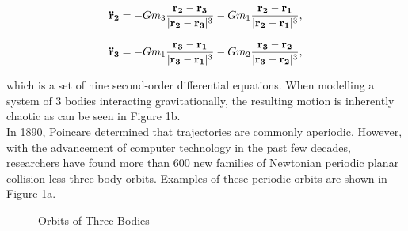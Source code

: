 \documentclass{article}
\begin{document}
\begin{equation}
    \mathbf{\Ddot{r}_2} = -Gm_3\frac{\mathbf{r_2}-\mathbf{r_3}}{\lvert\mathbf{r_2}-\mathbf{r_3}\rvert^3} - Gm_1\frac{\mathbf{r_2}-\mathbf{r_1}}{\lvert\mathbf{r_2}-\mathbf{r_1}\rvert^3},
\end{equation}

\begin{equation}
    \mathbf{\Ddot{r}_3} = -Gm_1\frac{\mathbf{r_3}-\mathbf{r_1}}{\lvert\mathbf{r_3}-\mathbf{r_1}\rvert^3} - Gm_2\frac{\mathbf{r_3}-\mathbf{r_2}}{\lvert\mathbf{r_3}-\mathbf{r_2}\rvert^3},
\end{equation}

\noindent which is a set of nine second-order differential equations. When modelling a system of 3 bodies interacting gravitationally, the resulting motion is inherently chaotic as can be seen in Figure 1b. \\

\noindent In 1890, Poincare determined that trajectories are commonly aperiodic. However, with the advancement of computer technology in the past few decades, researchers have found more than 600 new families of Newtonian periodic planar collision-less three-body orbits. Examples of these periodic orbits are shown in Figure 1a. \\


\begin{figure}%
    \centering
    \qquad
    \caption{Orbits of Three Bodies}%
    \label{fig: three body}%
\end{figure}
\end{document}

